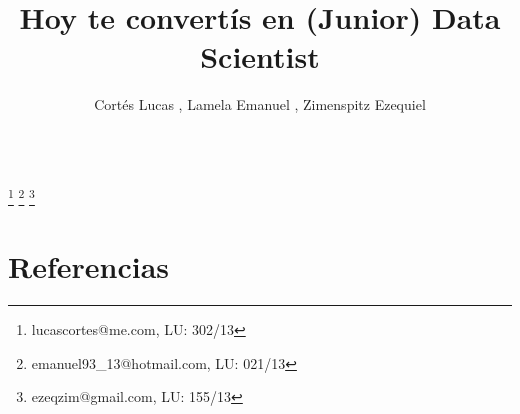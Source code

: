 \documentclass{endm}
\begin{document}
\begin{verbatim}\end{verbatim}\vspace{2.5cm}

\begin{frontmatter}

\title{Hoy te convert\'is en (Junior) Data Scientist}

\author{Cort\'es Lucas , Lamela Emanuel , Zimenspitz Ezequiel }
\address{Universidad de Buenos Aires\\ Buenos Aires, Argentina}

\thanks[lucasemail]{lucascortes@me.com, LU: 302/13}
\thanks[emanuelemail]{emanuel93\_13@hotmail.com, LU: 021/13}
\thanks[ezequielemail]{ezeqzim@gmail.com, LU: 155/13}

\begin{abstract}
\end{abstract}

\begin{keyword}
\end{keyword}

\end{frontmatter}









\section{Referencias}



\end{document}
